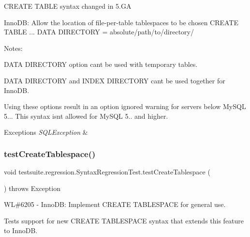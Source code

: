 C\+R\+E\+A\+TE T\+A\+B\+LE syntax changed in 5.\+GA

Inno\+DB\+: Allow the location of file-\/per-\/table tablespaces to be chosen C\+R\+E\+A\+TE T\+A\+B\+LE ... D\+A\+TA D\+I\+R\+E\+C\+T\+O\+RY = \textquotesingle{}absolute/path/to/directory/\textquotesingle{}

Notes\+:
\begin{DoxyItemize}
\item D\+A\+TA D\+I\+R\+E\+C\+T\+O\+RY option can\textquotesingle{}t be used with temporary tables.
\item D\+A\+TA D\+I\+R\+E\+C\+T\+O\+RY and I\+N\+D\+EX D\+I\+R\+E\+C\+T\+O\+RY can\textquotesingle{}t be used together for Inno\+DB.
\item Using these options result in an \textquotesingle{}option ignored\textquotesingle{} warning for servers below My\+S\+QL 5... This syntax isn\textquotesingle{}t allowed for My\+S\+QL 5.. and higher.
\end{DoxyItemize}


\begin{DoxyExceptions}{Exceptions}
{\em S\+Q\+L\+Exception} & \\
\hline
\end{DoxyExceptions}
\mbox{\label{classtestsuite_1_1regression_1_1_syntax_regression_test_ad1acd7d881976285b80df9ddb0a44558}} 
\subsubsection{\texorpdfstring{test\+Create\+Tablespace()}{testCreateTablespace()}}
{\footnotesize\ttfamily void testsuite.\+regression.\+Syntax\+Regression\+Test.\+test\+Create\+Tablespace (\begin{DoxyParamCaption}{ }\end{DoxyParamCaption}) throws Exception}

WL\#6205 -\/ Inno\+DB\+: Implement C\+R\+E\+A\+TE T\+A\+B\+L\+E\+S\+P\+A\+CE for general use.

Tests support for new C\+R\+E\+A\+TE T\+A\+B\+L\+E\+S\+P\+A\+CE syntax that extends this feature to Inno\+DB.

